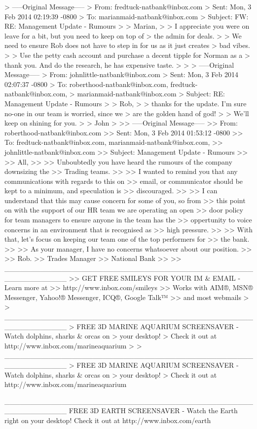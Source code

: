 \begin{spverbatim}
> -----Original Message-----
> From: fredtuck-natbank@inbox.com
> Sent: Mon, 3 Feb 2014 02:19:39 -0800
> To: marianmaid-natbank@inbox.com
> Subject: FW: RE: Management Update - Rumours
> 
> Marian,
> 
> I appreciate you were on leave for a bit, but you need to keep on top of
> the admin for deals.
> 
> We need to ensure Rob does not have to step in for us as it just creates
> bad vibes.
> 
> Use the petty cash account and purchase a decent tipple for Norman as a
> thank you. And do the research, he has expensive taste.
> 
> 
> -----Original Message-----
> From: johnlittle-natbank@inbox.com
> Sent: Mon, 3 Feb 2014 02:07:37 -0800
> To: roberthood-natbank@inbox.com, fredtuck-natbank@inbox.com,
> marianmaid-natbank@inbox.com
> Subject: RE: Management Update - Rumours
> 
> Rob,
> 
> thanks for the update. I'm sure no-one in our team is worried, since we
> are the golden hand of god!
> 
> We'll keep on shining for you.
> 
> John
> 
>> -----Original Message-----
>> From: roberthood-natbank@inbox.com
>> Sent: Mon, 3 Feb 2014 01:53:12 -0800
>> To: fredtuck-natbank@inbox.com, marianmaid-natbank@inbox.com,
>> johnlittle-natbank@inbox.com
>> Subject: Management Update - Rumours
>> 
>> All,
>> 
>> Unboubtedly you have heard the rumours of the company downsizing the
>> Trading teams.
>> 
>> I wanted to remind you that any communications with regards to this on
>> email, or communicator should be kept to a minimum, and speculation is
>> discouraged.
>> 
>> I can understand that this may cause concern for some of you, so from
>> this point on with the support of our HR team we are operating an open
>> door policy for team managers to ensure anyone in the team has the
>> oppertunity to voice concerns in an environment that is recognised as
>> high pressure.
>> 
>> With that, let's focus on keeping our team one of the top performers for
>> the bank.
>> 
>> As your manager, I have no concerns whatsoever about our position.
>> 
>> Rob.
>> Trades Manager
>> National Bank
>> 
>> ____________________________________________________________
>> GET FREE SMILEYS FOR YOUR IM & EMAIL - Learn more at
>> http://www.inbox.com/smileys
>> Works with AIM®, MSN® Messenger, Yahoo!® Messenger, ICQ®, Google Talk™
>> and most webmails
> 
> ____________________________________________________________
> FREE 3D MARINE AQUARIUM SCREENSAVER - Watch dolphins, sharks & orcas on
> your desktop!
> Check it out at http://www.inbox.com/marineaquarium
> 
> ____________________________________________________________
> FREE 3D MARINE AQUARIUM SCREENSAVER - Watch dolphins, sharks & orcas on
> your desktop!
> Check it out at http://www.inbox.com/marineaquarium

____________________________________________________________
FREE 3D EARTH SCREENSAVER - Watch the Earth right on your desktop!
Check it out at http://www.inbox.com/earth


\end{spverbatim}

